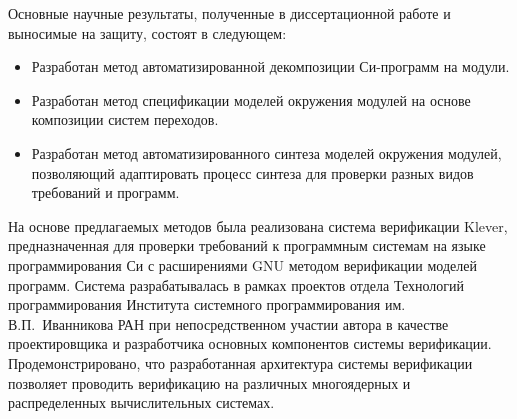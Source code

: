 \conclusion

Основные научные результаты, полученные в диссертационной работе и выносимые на защиту, состоят в следующем:
\begin{itemize}
    \item Разработан метод автоматизированной декомпозиции Си-программ на модули.
    \item Разработан метод спецификации моделей окружения модулей на основе композиции систем переходов.
    \item Разработан метод автоматизированного синтеза моделей окружения модулей, позволяющий адаптировать процесс синтеза для проверки разных видов требований и программ.
\end{itemize}

На основе предлагаемых методов была реализована система верификации Klever, предназначенная для проверки требований к программным системам на языке программирования Си с расширениями GNU методом верификации моделей программ.
Система разрабатывалась в рамках проектов отдела Технологий программирования Института системного программирования им. В.П.~Иванникова РАН при непосредственном участии автора в качестве проектировщика и разработчика основных компонентов системы верификации.
Продемонстрировано, что разработанная архитектура системы верификации позволяет проводить верификацию на различных многоядерных и распределенных вычислительных системах.
